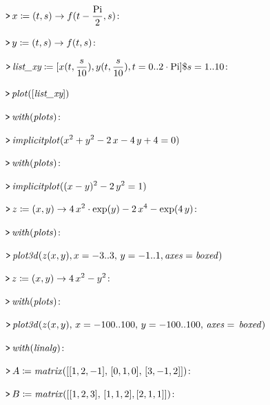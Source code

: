 \documentclass{article}
\begin{document}
\mapleinput
{$ \displaystyle \texttt{>\,} x \coloneqq (t ,s)\rightarrow f (t -\frac{\mathrm{Pi}}{2},s)\colon  $}

\mapleinput
{$ \displaystyle \texttt{>\,} y \coloneqq (t ,s)\rightarrow f (t ,s)\colon  $}

\mapleinput
{$ \displaystyle \texttt{>\,} \textit{list\_xy} \coloneqq [x (t ,\frac{s}{10}),y (t ,\frac{s}{10}),t =0..2\cdot \mathrm{Pi}]\$ s =1..10\colon  $}

\mapleinput
{$ \displaystyle \texttt{>\,} \mathit{plot} ([\textit{list\_xy}]) $}

{}
\mapleinput
{$ \displaystyle \texttt{>\,} \mathit{with} (\mathit{plots})\colon  $}

\mapleinput
{$ \displaystyle \texttt{>\,} \mathit{implicitplot} (x^{2}+y^{2}-2\,x -4\,y +4=0) $}

{}
\mapleinput
{$ \displaystyle \texttt{>\,} \mathit{with} (\mathit{plots})\colon  $}

\mapleinput
{$ \displaystyle \texttt{>\,} \mathit{implicitplot} ((x -y)^{2}-2\,y^{2}=1) $}

{}
\mapleinput
{$ \displaystyle \texttt{>\,} z \coloneqq (x ,y)\rightarrow 4\,x^{2}\cdot \exp (y)-2\,x^{4}-\exp (4\,y)\colon  $}

\mapleinput
{$ \displaystyle \texttt{>\,} \mathit{with} (\mathit{plots})\colon  $}

\mapleinput
{$ \displaystyle \texttt{>\,} \mathit{plot3d} (z (x ,y),x =-3..3,\,y =-1..1,\mathit{axes} =\mathit{boxed}) $}

{}
\mapleinput
{$ \displaystyle \texttt{>\,} z \coloneqq (x ,y)\rightarrow 4\,x^{2}-y^{2}\colon  $}

\mapleinput
{$ \displaystyle \texttt{>\,} \mathit{with} (\mathit{plots})\colon  $}

\mapleinput
{$ \displaystyle \texttt{>\,} \mathit{plot3d} (z (x ,y),\,x =-100..100,\,y =-100..100,\,\mathit{axes} =\,\mathit{boxed}) $}

{}
\mapleinput
{$ \displaystyle \texttt{>\,} \mathit{with} (\mathit{linalg})\colon  $}

\mapleinput
{$ \displaystyle \texttt{>\,} A \coloneqq \mathit{matrix} ([[1,2,-1],\,[0,1,0],\,[3,-1,2]])\colon  $}

\mapleinput
{$ \displaystyle \texttt{>\,} B \coloneqq \mathit{matrix} ([[1,2,3],\,[1,1,2],[2,1,1]])\colon  $}
\end{document}
